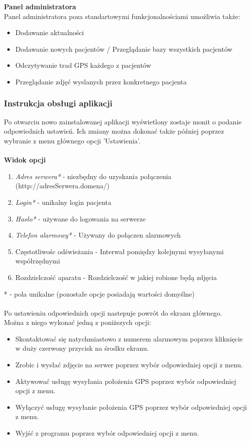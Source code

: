 \documentclass[11pt,a4paper]{article}
\begin{document}
{\bf Panel administratora}\\
Panel administratora poza standartowymi funkcjonalnościami umożliwia także:
\begin{itemize}
\item Dodawanie aktualności
\item Dodawanie nowych pacjentów / Przeglądanie bazy wszystkich pacjentów
\item Odczytywanie trad GPS każdego z pacjentów
\item Przeglądanie zdjęć wyslanych przez konkretnego pacjenta
\end{itemize}

\subsubsection{Instrukcja obsługi aplikacji}

Po otwarciu nowo zainstalowanej aplikacji wyświetlony zostaje monit o podanie odpowiednich ustawień.
Ich zmiany można dokonać także później poprzez wybranie z menu głównego opcji 'Ustawienia'.\\
\\
{\bf Widok opcji}
\begin{enumerate}
\item {\it Adres serwera*} - niezbędny do uzyskania połączenia (http://adresSerwera.domena/)
\item {\it Login*} - unikalny login pacjenta
\item {\it Hasło*} - używane do logowania na serwerze
\item {\it Telefon alarmowy*} - Używany do połączen alarmowych
\item Częstotliwośc odświeżania - Interwał pomiędzy kolejnymi wysyłanymi współrzędnymi
\item Rozdzielczość aparatu - Rozdzielczość w jakiej robione będą zdjęcia
\end{enumerate}

* - pola unikalne (pozostałe opcje posiadają wartości domyślne)
\\\\
Po ustawieniu odpowiednich opcji nastepuje powrót do ekranu głównego. \\Można z niego wykonać jedną z poniższych opcji:
\begin{itemize}
\item Skontaktować się natychmiastowo z numerem alarmowym poprzez kliknięcie w duży czerwony przycisk na środku ekranu.
\item Zrobic i wysłać zdjęcie na serwer  poprzez wybór odpowiedniej opcji z menu.
\item Aktywować usługę wysyłania położenia GPS poprzez wybór odpowiedniej opcji z menu.
\item Wyłączyć usługę wysyłanie położenia GPS  poprzez wybór odpowiedniej opcji z menu.
\item Wyjść z programu poprzez wybór odpowiedniej opcji z menu.
\end{itemize}
\end{document}
